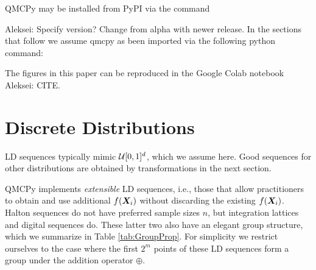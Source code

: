 \documentclass[graybox,footinfo]{svmult}
\newcommand{\AGSComment}[1]{{\color{cyan} Aleksei: #1}}
\begin{document}
QMCPy may be installed from PyPI via the command 
 
\AGSComment{Specify version? Change from alpha with newer release.}
In the sections that follow we assume qmcpy as been imported via the following python command: 

The figures in this paper can be reproduced in the Google Colab notebook \AGSComment{CITE}.

\section{Discrete Distributions}

LD sequences typically mimic ${\mathcal{U}}[0,1]^d$, which we assume here.  Good sequences for other distributions are obtained by transformations in the next section.  

QMCPy implements \emph{extensible} LD sequences, i.e., those that allow practitioners to obtain and use additional $f({\boldsymbol{X}}_i)$ without discarding the existing $f({\boldsymbol{X}}_i)$.  Halton sequences do not have preferred sample sizes $n$, but integration lattices and digital sequences do.  These latter two also have an elegant group structure, which we summarize in Table \ref{tab:GroupProp}.  For simplicity we restrict ourselves to the case where the first $2^m$ points of these LD sequences form a group under the addition operator $\oplus$.
\end{document}
